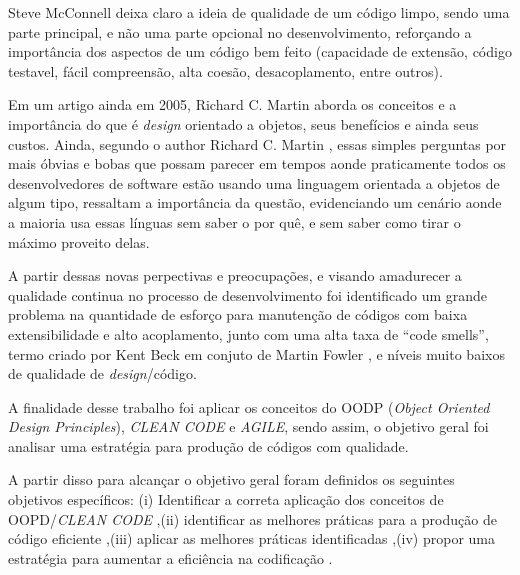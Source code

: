 \documentclass[12pt]{article}
\begin{document}
Steve McConnell \cite{CODE_COMPLETE_2} deixa claro a ideia de qualidade de um código limpo, sendo uma parte principal, e não uma parte opcional no desenvolvimento, reforçando a importância dos aspectos de um código bem feito (capacidade de extensão, código testavel, fácil compreensão, alta coesão, desacoplamento, entre outros).

Em um artigo ainda em 2005, Richard C. Martin \cite{THE_PRINCIPLES_OF_OOD} aborda os conceitos e a importância do que é \textit{design} orientado a objetos, seus benefícios e ainda seus custos.
Ainda, segundo o author Richard C. Martin \cite{THE_PRINCIPLES_OF_OOD}, essas simples perguntas por mais óbvias e bobas que possam parecer em tempos aonde praticamente todos os desenvolvedores de software estão usando uma linguagem orientada a objetos de algum tipo, ressaltam a importância da questão, evidenciando um cenário aonde a maioria usa essas línguas sem saber o por quê, e sem saber como tirar o máximo proveito delas.
	 

A partir dessas novas perpectivas e preocupações, e visando amadurecer a qualidade continua no processo de desenvolvimento foi identificado um grande problema na quantidade de esforço para manutenção de códigos com baixa extensibilidade e alto acoplamento, junto com uma alta taxa de “code smells”, termo criado por Kent Beck em conjuto de Martin Fowler \cite{MARTIN_FOWLER_REFACTORING}, e níveis muito baixos de qualidade de \textit{design}/código.



A finalidade desse trabalho foi aplicar os conceitos do OODP (\textit{Object Oriented Design Principles}), \textit{CLEAN CODE} e \textit{AGILE}, sendo assim, o objetivo geral foi analisar uma estratégia para produção de códigos com qualidade. 

A partir disso para alcançar o objetivo geral foram definidos os seguintes objetivos específicos: 
(i) Identificar a correta aplicação dos conceitos de OOPD/\textit{CLEAN CODE}
,(ii) identificar as melhores práticas para a produção de código eficiente
,(iii) aplicar as melhores práticas identificadas
,(iv) propor uma estratégia para aumentar a eficiência na codificação
.
\end{document}
